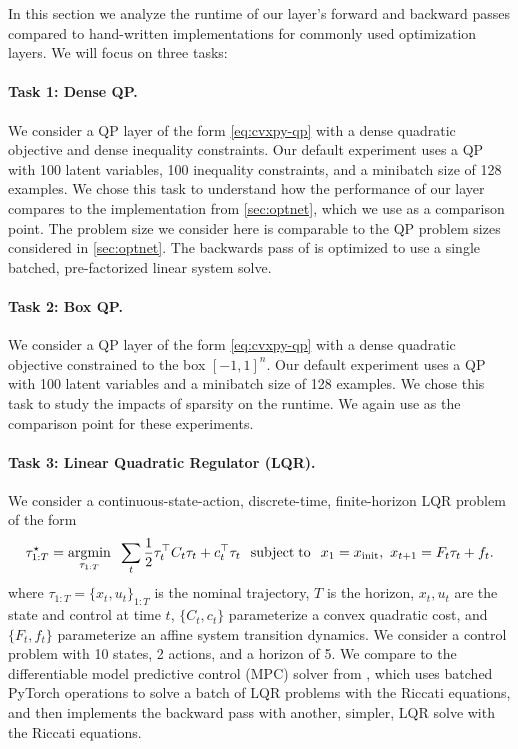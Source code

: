 In this section we analyze the runtime of our layer's forward
and backward passes compared to hand-written implementations
for commonly used optimization layers.
We will focus on three tasks:

\paragraph{Task 1: Dense QP.}
We consider a QP layer of the form
\cref{eq:cvxpy-qp} with a dense quadratic objective
and dense inequality constraints.
Our default experiment uses a QP with 100 latent
variables, 100 inequality constraints, and
a minibatch size of 128 examples.
We chose this task to understand how the performance
of our \cvxpy{} layer compares to the \qpth implementation
from \cref{sec:optnet}, which we use as a comparison point.
The problem size we consider here is comparable
to the QP problem sizes considered in \cref{sec:optnet}.
The backwards pass of \qpth is optimized to use a single
batched, pre-factorized linear system solve.

\paragraph{Task 2: Box QP.}
We consider a QP layer of the form
\cref{eq:cvxpy-qp} with a dense quadratic objective
constrained to the box $[-1, 1]^n$.
Our default experiment uses a QP with 100 latent
variables and a minibatch size of 128 examples.
We chose this task to study the impacts of
sparsity on the runtime.
We again use \qpth as the comparison point for these experiments.

\paragraph{Task 3: Linear Quadratic Regulator (LQR).}
We consider a continuous-state-action, discrete-time, finite-horizon
LQR problem of the form
\begin{equation}
  \label{eq:cvxpyth:lqr}
  \tau^{\star}_{1:T} = \operatorname*{argmin}_{\tau_{1:T}}\;\;
  \sum_{t} \frac{1}{2} \tau_t^\top  C_t \tau_t + c_t^\top  \tau_t \;\;
  \operatorname*{subject\;to}\;\;
  x_1 = x_{\rm init},\
  x_{t+1} = F_t\tau_t + f_t.
\end{equation}
where $\tau_{1:T} = \{x_t, u_t\}_{1:T}$ is the nominal trajectory,
$T$ is the horizon,
$x_t, u_t$ are the state and control at time $t$,
$\{C_t, c_t\}$ parameterize a convex quadratic cost,
and $\{F_t, f_t\}$ parameterize an affine system
transition dynamics.
We consider a control problem with 10 states,
2 actions, and a horizon of 5.
We compare to the differentiable model
predictive control (MPC) solver from
\citep{amos2018differentiable}, which uses batched
PyTorch operations to solve a batch of LQR problems with
the Riccati equations, and then implements the backward
pass with another, simpler, LQR solve with
the Riccati equations.

